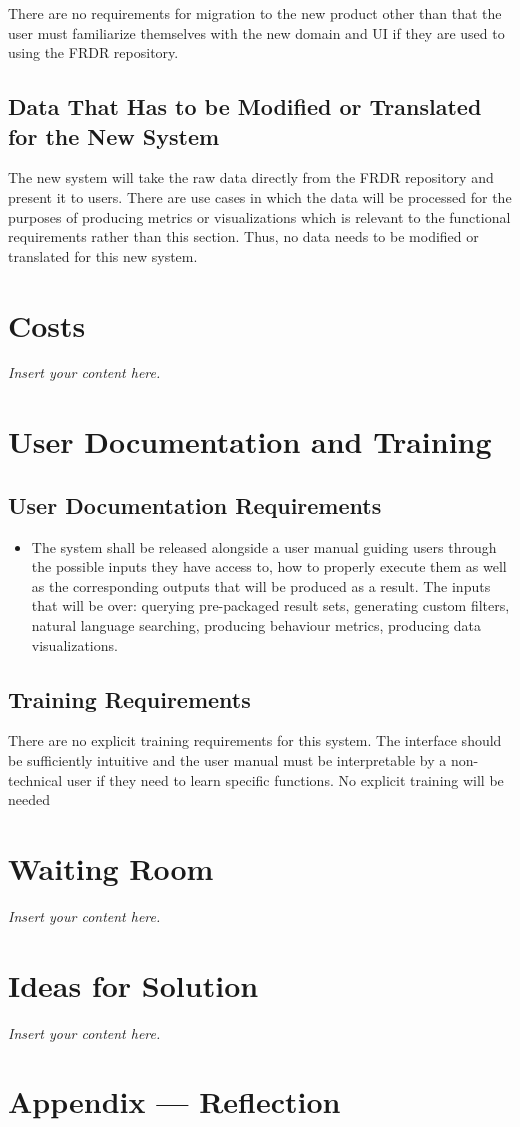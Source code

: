 \documentclass[12pt]{article}
\newcommand{\lips}{\textit{Insert your content here.}}
\begin{document}
\par{There are no requirements for migration to the new product other than that the user must familiarize themselves with the new domain and UI if they are used to using the FRDR repository.}


\subsection{Data That Has to be Modified or Translated for the New System}

\par{The new system will take the raw data directly from the FRDR repository and present it to users. There are use cases in which the data will be processed for the purposes 
     of producing metrics or visualizations which is relevant to the functional requirements rather than this section. Thus, no data needs to be modified or translated for this new system.}

\section{Costs}
\lips
\section{User Documentation and Training}
\subsection{User Documentation Requirements}

\begin{itemize}
    \item The system shall be released alongside a user manual guiding users through the possible inputs they have access to, how to properly execute them as well as the corresponding outputs that will be produced as a result. The inputs that 
    will be over: querying pre-packaged result sets, generating custom filters, natural language searching, producing behaviour metrics, producing data visualizations.
\end{itemize}

\subsection{Training Requirements}

\par{ There are no explicit training requirements for this system. The interface should be sufficiently intuitive and the user manual must be interpretable by a non-technical user if they need to learn specific functions.
No explicit training will be needed }

\section{Waiting Room}
\lips

\section{Ideas for Solution}
\lips

\newpage{}
\section*{Appendix --- Reflection}




\end{document}

